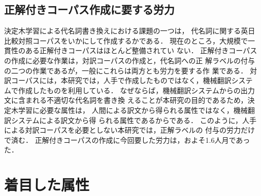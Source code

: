 \subsection{正解付きコーパス作成に要する労力}

決定木学習による代名詞書き換えにおける課題の一つは，
代名詞に関する英日比較対照コーパスをいかにして作成するかである．
現在のところ，大規模で一貫性のある正解付きコーパスはほとんど整備されてい
ない．
正解付きコーパスの作成に必要な作業は，対訳コーパスの作成と，代名詞への正
解ラベルの付与の二つの作業であるが，一般にこれらは両方とも労力を要する作
業である．
対訳コーパスには，本研究では，人手で作成したものではなく，機械翻訳システ
ムで作成したものを利用している．
なぜならば，機械翻訳システムからの出力文に含まれる不適切な代名詞を書き換
えることが本研究の目的であるため，決定木学習に必要な属性は，
人間による訳文から得られる属性ではなく，機械翻訳システムによる訳文から得
られる属性であるからである．
このように，人手による対訳コーパスを必要としない本研究では，正解ラベルの
付与の労力だけで済む．
正解付きコーパスの作成に今回要した労力は，およそ1.6人月であった．

\section{着目した属性}
\label{sec:feats}

